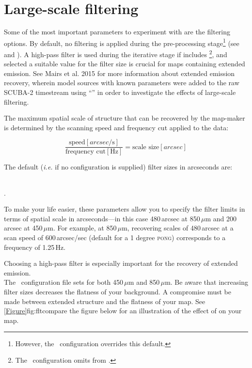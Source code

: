 \section{Large-scale filtering}
\label{sec:filt}

Some of the most important parameters to experiment with are the
filtering options. By default, no filtering is applied during the
pre-processing stage\footnote{However, the \blankfield\ configuration
overrides this default.} (see 
and ). A high-pass
filter is used during the iterative stage if 
includes \footnote{The \blankfield\ configuration omits
 from .}, and selected a suitable value
for the filter size is crucial for maps containing extended emission. See
Mairs et al. 2015 \cite{extendedrecovery} for more information about
extended emission recovery, wherein model sources with known parameters
were added to the raw SCUBA-2 timestream using
``'' in order to investigate the effects of large-scale filtering.

The maximum spatial scale of structure that can be recovered by the
map-maker is determined by the scanning speed and frequency cut
applied to the data:

\begin{equation}
\frac{\textrm{speed}[arcsec / \textrm{s}]}{\textrm{frequency
    cut}[\textrm{Hz}]}=\textrm{scale size}[arcsec]
\end{equation}

The default (\emph{i.e.} if no configuration is supplied) filter sizes
in arcseconds are:

 \\
.

To make your life easier, these parameters allow you to specify the
filter limits in terms of spatial scale in arcseconds---in this case
480\,arcsec at 850\,$\mu$m and 200\,arcsec at 450\,$\mu$m. For example,
at 850\,$\mu$m, recovering scales of 480\,arcsec at a scan speed of
600\,arcsec/sec (default for a 1 degree \textsc{pong}) corresponds to
a frequency of 1.25\,Hz.

Choosing a high-pass filter is especially important for the recovery
of extended emission.\\ The \brightextended\ configuration file sets
for both 450\,$\mu$m and 850\,$\mu$m. Be aware that increasing filter sizes
decreases the flatness of your background. A compromise must be made between
extended structure and the flatness of your map. See \cref{Figure}{fig:fltcompare}
{the figure below} for an illustration of the effect of
 on your map.

